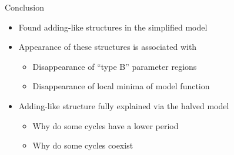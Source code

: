 
\begin{frame}{Conclusion}
	\begin{itemize}
		\item Found adding-like structures in the simplified model
		      \pause
		\item Appearance of these structures is associated with
		      \begin{itemize}
			      \item Disappearance of ``type B'' parameter regions
			      \item Disappearance of local minima of model function
		      \end{itemize}
		      \pause
		\item Adding-like structure fully explained via the halved model
		      \begin{itemize}
			      \item Why do some cycles have a lower period
			      \item Why do some cycles coexist
		      \end{itemize}
	\end{itemize}
\end{frame}
